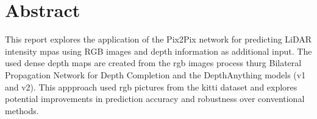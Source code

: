 \section*{Abstract}
This report explores the application of the Pix2Pix network for predicting LiDAR intensity mpas using RGB images and depth information as additional input. The used dense depth maps are created from the rgb images process thurg Bilateral Propagation Network for Depth Completion and the DepthAnything models (v1 and v2). This appproach used rgb pictures from the kitti dataset and explores potential improvements in prediction accuracy and robustness over conventional methods.
